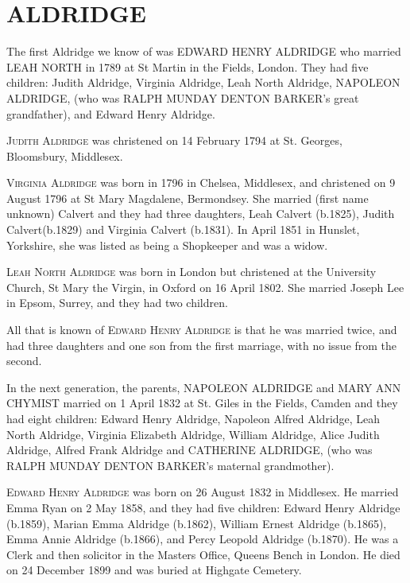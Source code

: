 \section{ALDRIDGE}

The first Aldridge we know of was \uppercase{Edward Henry Aldridge} who married \uppercase{Leah North} in 1789 at St Martin in the Fields, London. They had five children: Judith Aldridge, Virginia Aldridge, Leah North Aldridge, \uppercase{Napoleon Aldridge}, (who was \uppercase{Ralph Munday Denton Barker}'s great grandfather), and Edward Henry Aldridge. 

\textsc{Judith Aldridge} was christened on 14 February 1794 at St. Georges,	Bloomsbury, Middlesex.

\textsc{Virginia Aldridge} was born in 1796 in Chelsea, Middlesex, and christened on 9 August 1796 at St Mary Magdalene,  	Bermondsey. She married  (first name unknown) Calvert and they had three daughters, Leah Calvert (b.1825), Judith Calvert(b.1829) and Virginia Calvert (b.1831). In April 1851 in	Hunslet, Yorkshire, she was listed as being a Shopkeeper and was a widow.

\textsc{Leah North Aldridge} was born in London but christened at the University Church, St Mary the Virgin, in Oxford on 16 April 1802. She married Joseph Lee in Epsom, Surrey, and they had two children.

All that is known of \textsc{Edward Henry Aldridge} is that he was married twice, and had three daughters and one son from the first marriage,  with no issue from the second. 


In the next generation, the parents, \uppercase{Napoleon Aldridge} and \uppercase{Mary Ann Chymist} married on 1 April 1832 at St. Giles in the Fields, Camden and they had eight children: Edward Henry Aldridge, Napoleon Alfred Aldridge, Leah North Aldridge, Virginia Elizabeth Aldridge, William Aldridge, Alice Judith Aldridge, Alfred Frank Aldridge and \uppercase{Catherine Aldridge}, (who was \uppercase{Ralph Munday Denton Barker}'s maternal grandmother).

\textsc{Edward Henry Aldridge} was born on 26 August 1832 in Middlesex. He married Emma Ryan on 2 May 1858, and they had five children: Edward Henry Aldridge (b.1859), Marian Emma Aldridge (b.1862), William Ernest Aldridge (b.1865), Emma Annie Aldridge (b.1866), and Percy Leopold Aldridge (b.1870). He was a Clerk and then solicitor in the Masters Office, Queens Bench in London. He died on 24 December 1899 and was buried at Highgate Cemetery.

